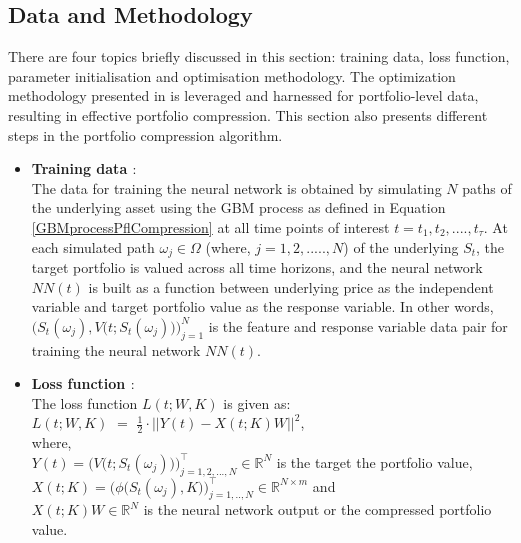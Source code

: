 \subsection{Data and Methodology}
\label{Data and Methodology - Chp 5}

There are four topics briefly discussed in this section: training data, loss function, parameter initialisation and optimisation methodology. The optimization methodology presented in \cite{dhandapani2024bermudan} is leveraged and harnessed for portfolio-level data, resulting in effective portfolio compression. This section also presents different steps in the portfolio compression algorithm. 

\begin{itemize}
    \item {\bf Training data \bf}: \\
    The data for training the neural network is obtained by simulating $N$ paths of the underlying asset using the GBM process as defined in Equation \ref{GBMprocessPflCompression} at all time points of interest $t = t_1, t_2, ...., t_{\tau}$. At each simulated path $\omega_j \in \Omega$ (where, $j = 1, 2, ....., N$) of the underlying $S_{t}$, the target portfolio is valued across all time horizons, and the neural network $NN(t)$ is built as a function between underlying price as the independent variable and target portfolio value as the response variable. In other words, $\Big(S_t(\omega_j), V \big(t; S_{t}(\omega_j) \big) \Big)_{j=1}^{N}$ is the feature and response variable data pair for training the neural network $NN(t)$. \\
    
    \item {\bf Loss function \bf}: \\
    The loss function $L(t; W, K)$ is given as: \\
    
    $L(t; W, K)$ $=$ $\frac{1}{2} \cdot ||Y(t) - X(t;K) W||^{2}$,\\
    
    \noindent where, \\
    $Y(t) = \Big( V \big(t; S_{t}(\omega_j) \big) \Big)^{\intercal}_{j=1, 2, ..., N} \in \mathbb{R}^{N}$ is the target the portfolio value, \\
    $X(t;K) = \Big( \phi \big(S_{t}(\omega_j), K \big) \Big)^{\intercal}_{j=1, .., N} \in \mathbb{R}^{N \times m}$ and \\
    $X(t;K)W \in \mathbb{R}^{N}$ is the neural network output or the compressed portfolio value. \\


\end{itemize}
